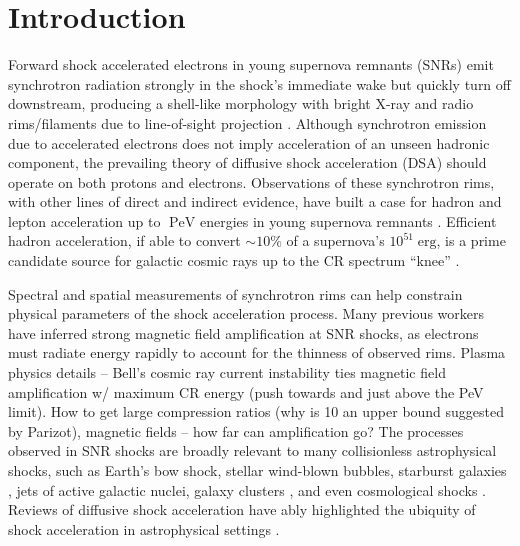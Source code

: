 \documentclass[iop, apj, numberedappendix, twocolappendix]{emulateapj}
\newcommand*{\mt}{\mathrm}
\newcommand*{\unit}[1]{\;\mt{#1}}  %
\newcommand*{\abt}{\mathord{\sim}} %
\begin{document}


\section{Introduction} \label{sec:intro}

Forward shock accelerated electrons in young supernova remnants (SNRs) emit
synchrotron radiation strongly in the shock's immediate wake but quickly turn
off downstream, producing a shell-like morphology with bright X-ray and radio
rims/filaments due to line-of-sight projection \citep{koyama1995}.  Although
synchrotron emission due to accelerated electrons does not imply acceleration
of an unseen hadronic component, the prevailing theory of diffusive shock
acceleration (DSA) should operate on both protons and electrons.  Observations
of these synchrotron rims, with other lines of direct and indirect evidence,
have built a case for hadron and lepton acceleration up to $\unit{PeV}$
energies in young supernova remnants \citep{uchiyama2007, aharonian2004,
acero2010, ackermann2013} . Efficient
hadron acceleration, if able to convert $\abt10\%$ of a supernova's $10^{51}
\unit{erg}$, is a prime candidate source for galactic cosmic rays up to the CR
spectrum ``knee'' \citep{vink2012}.

Spectral and spatial measurements of synchrotron rims can help constrain
physical parameters of the shock acceleration process.  Many previous workers
have inferred strong magnetic field amplification at SNR shocks, as electrons
must radiate energy rapidly to account for the thinness of observed rims.
 Plasma physics details -- Bell's cosmic ray current
instability \citep{bell2001} ties magnetic field amplification w/ maximum CR
energy (push towards and just above the PeV limit).  How to get large
compression ratios (why is 10 an upper bound suggested by Parizot), magnetic
fields -- how far can amplification go?
The processes observed in SNR shocks are broadly relevant to many collisionless
astrophysical shocks, such as Earth's bow shock, stellar wind-blown bubbles,
starburst galaxies \citep{heckman1990}, jets of active galactic nuclei, galaxy
clusters \citep{van-weeren2010}, and even cosmological shocks
\citep{miniati2000, ryu2008}.  Reviews of diffusive shock acceleration have
ably highlighted the ubiquity of shock acceleration in astrophysical settings
 \citep[e.g.,][]{blandford1987, malkov2001}.
\end{document}
